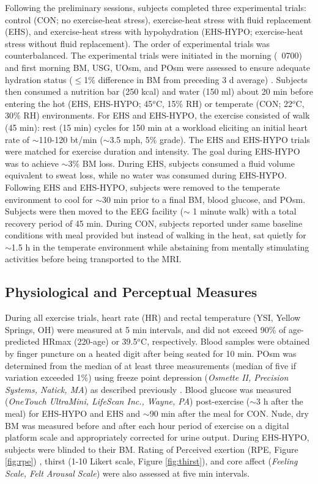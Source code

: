 Following the preliminary sessions, subjects completed three experimental trials: control (CON; no exercise-heat stress), exercise-heat stress with fluid replacement (EHS), and exercise-heat stress with hypohydration (EHS-HYPO; exercise-heat stress without fluid replacement). The order of experimental trials was counterbalanced. The experimental trials were initiated in the morning (~0700) and first morning BM, USG, UOsm, and POsm were assessed to ensure adequate hydration status (${\leq}$1\% difference in BM from preceding 3 d average) \cite{cheuvront_biological_2010}. Subjects then consumed a nutrition bar (250 kcal) and water (150 ml) about 20 min before entering the hot (EHS, EHS-HYPO; 45${^o}$C, 15\% RH) or temperate (CON; 22${^o}$C, 30\% RH) environments. For EHS and EHS-HYPO, the exercise consisted of walk (45 min): rest (15 min) cycles for 150 min at a workload eliciting an initial heart rate of ${\sim}$110-120 bt/min (${\sim}$3.5 mph, 5\% grade). The EHS and EHS-HYPO trials were matched for exercise duration and intensity. The goal during EHS-HYPO was to achieve ${\sim}$3\% BM loss. During EHS, subjects consumed a fluid volume equivalent to sweat loss, while no water was consumed during EHS-HYPO. Following EHS and EHS-HYPO, subjects were removed to the temperate environment to cool for ${\sim}$30 min prior to a final BM, blood glucose, and POsm. Subjects were then moved to the EEG facility (${\sim}$ 1 minute walk) with a total recovery period of 45 min. During CON, subjects reported under same baseline conditions with meal provided but instead of walking in the heat, sat quietly for ${\sim}$1.5 h in the temperate environment while abstaining from mentally stimulating activities before being transported to the MRI.

\subsection{Physiological and Perceptual Measures}
During all exercise trials, heart rate (HR) and rectal temperature (YSI, Yellow Springs, OH) were measured at 5 min intervals, and did not exceed 90\% of age-predicted HRmax (220-age) or 39.5${^o}$C, respectively.  Blood samples were obtained by finger puncture on a heated digit after being seated for 10 min. POsm was determined from the median of at least three measurements (median of five if variation exceeded 1\%) using freeze point depression (\textit{Osmette II, Precision Systems, Natick, MA}) as described previously \cite{wittbrodt_biological_2015}. Blood glucose was measured (\textit{OneTouch UltraMini, LifeScan Inc., Wayne, PA}) post-exercise (${\sim}$3 h after the meal) for EHS-HYPO and EHS and ${\sim}$90 min after the meal for CON. Nude, dry BM was measured before and after each hour period of exercise on a digital platform scale and appropriately corrected for urine output. During EHS-HYPO, subjects were blinded to their BM. Rating of Perceived exertion (RPE, Figure \ref{fig:rpe}) \cite{borg_psychophysical_1982}, thirst (1-10 Likert scale, Figure \ref{fig:thirst}), and core affect (\textit{Feeling Scale, Felt Arousal Scale}) \cite{hardy_not_1989,gauvin_exercise-induced_1993} were also assessed at five min intervals.

